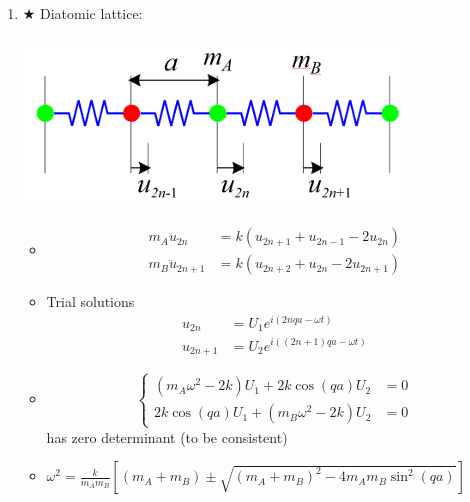 \documentclass{article}
\theoremstyle{remark}
\theoremstyle{remark}
\newcommand{\myref}[1]{\hyperref[back:#1]{$\bigstar$}\label{#1}}
\begin{document}
\begin{enumerate}
    \item \myref{thm:diatomic_dispersion} Diatomic lattice:
        \begin{center}
            \includegraphics*[width=0.4\linewidth]{cmp_phonon_diatomic.png}
        \end{center}
        \begin{minipage}{0.75\linewidth}
        \begin{itemize}
            \item \begin{align*}
                m_A\ddot{u}_{2n} &= k(u_{2n+1}+u_{2n-1}-2u_{2n})\\
                m_B\ddot{u}_{2n+1} &= k(u_{2n+2}+u_{2n}-2u_{2n+1})
            \end{align*}
            \item Trial solutions\begin{align*}
                u_{2n} &= U_1e^{i(2nqa-\omega t)}\\
                u_{2n+1} &= U_2e^{i((2n+1)qa-\omega t)}
            \end{align*}
            \item $$\begin{cases}
                    (m_A\omega^2-2k)U_1+2k\cos(qa)U_2 &= 0\\
                    2k\cos(qa)U_1+(m_B\omega^2-2k)U_2 &= 0
                \end{cases}$$ has zero determinant (to be consistent)
            \item $\omega^2=\frac{k}{m_A m_B}\left[(m_A+m_B)\pm\sqrt{(m_A+m_B)^2-4m_Am_B\sin^2(qa)}\right]$
        \end{itemize}
        \end{minipage}
        \begin{minipage}{0.23\linewidth}
            \begin{center}

\end{center}
\end{minipage}
\end{enumerate}
\end{document}
